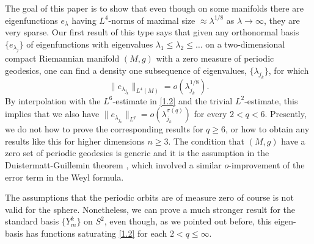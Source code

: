 \documentclass[10pt]{amsart}
\begin{document}
The goal of this paper is to show that even though on some
manifolds there are eigenfunctions
$e_\lambda$ having $L^4$-norms of maximal size $\approx \lambda^{1/8}$
as $\lambda\to \infty$, they are very sparse.  Our first result
of this type says that given any orthonormal basis $\{e_{\lambda_j}\}$
of eigenfunctions with eigenvalues $\lambda_1\le \lambda_2\le\dots$
on a two-dimensional compact Riemannian manifold $(M,g)$ with a zero
measure of periodic geodesics,
one can find a density one subsequence of eigenvalues, $\{\lambda_{j_k}\}$,
for which
\begin{equation}\label{1.5}
\|e_{\lambda_{j_k}}\|_{L^4(M)}=o(\lambda_{j_k}^{1/8}).
\end{equation}
By interpolation with the $L^6$-estimate  in \eqref{1.2}
and the trivial $L^2$-estimate, this implies
that we also have $\|e_{\lambda_{j_k}}\|_{L^q}=o(\lambda_{j_k}^{\sigma(q)})$ for
every $2<q<6$.  Presently, we do not how to prove the corresponding
results for $q\ge6$, or how to obtain any results like this for higher
dimensions $n\ge3$.  The condition that $(M,g)$ have a zero set of
periodic geodesics is generic and it is the assumption in the
 Duistermatt-Guillemin theorem \cite{dg}, which involved a similar $o$-improvement of the error term in the Weyl formula.

The assumptions that the periodic orbits are of measure zero of
course is not valid for the sphere. Nonetheless,  we can prove a
much stronger result for the standard basis $\{Y^k_m\}$ on $S^2$,
even though, as we pointed out before, this eigen-basis has
functions saturating \eqref{1.2} for each $2<q\le \infty$.
\end{document}
